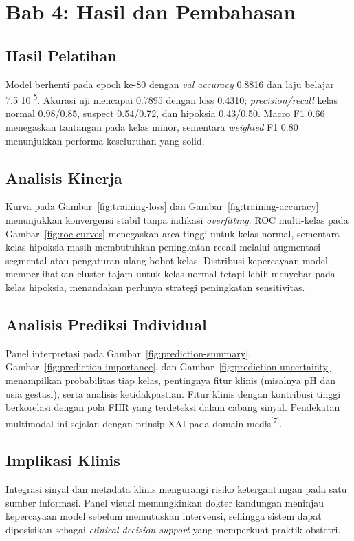 \documentclass[12pt,a4paper]{article}
\begin{document}
\section{Bab 4: Hasil dan Pembahasan}
\subsection{Hasil Pelatihan}
Model berhenti pada epoch ke-80 dengan \textit{val accuracy} 0.8816 dan laju belajar 7.5\,\texttimes\,10\textsuperscript{-5}. Akurasi uji mencapai 0.7895 dengan loss 0.4310; \textit{precision/recall} kelas normal 0.98/0.85, suspect 0.54/0.72, dan hipoksia 0.43/0.50. Macro F1 0.66 menegaskan tantangan pada kelas minor, sementara \textit{weighted} F1 0.80 menunjukkan performa keseluruhan yang solid.

\subsection{Analisis Kinerja}
Kurva pada Gambar~\ref{fig:training-loss} dan Gambar~\ref{fig:training-accuracy} menunjukkan konvergensi stabil tanpa indikasi \textit{overfitting}. ROC multi-kelas pada Gambar~\ref{fig:roc-curves} menegaskan area tinggi untuk kelas normal, sementara kelas hipoksia masih membutuhkan peningkatan recall melalui augmentasi segmental atau pengaturan ulang bobot kelas. Distribusi kepercayaan model memperlihatkan cluster tajam untuk kelas normal tetapi lebih menyebar pada kelas hipoksia, menandakan perlunya strategi peningkatan sensitivitas.

\subsection{Analisis Prediksi Individual}
Panel interpretasi pada Gambar~\ref{fig:prediction-summary}, Gambar~\ref{fig:prediction-importance}, dan Gambar~\ref{fig:prediction-uncertainty} menampilkan probabilitas tiap kelas, pentingnya fitur klinis (misalnya pH dan usia gestasi), serta analisis ketidakpastian. Fitur klinis dengan kontribusi tinggi berkorelasi dengan pola FHR yang terdeteksi dalam cabang sinyal. Pendekatan multimodal ini sejalan dengan prinsip XAI pada domain medis\textsuperscript{[7]}.

\subsection{Implikasi Klinis}
Integrasi sinyal dan metadata klinis mengurangi risiko ketergantungan pada satu sumber informasi. Panel visual memungkinkan dokter kandungan meninjau kepercayaan model sebelum memutuskan intervensi, sehingga sistem dapat diposisikan sebagai \textit{clinical decision support} yang memperkuat praktik obstetri.
\end{document}
